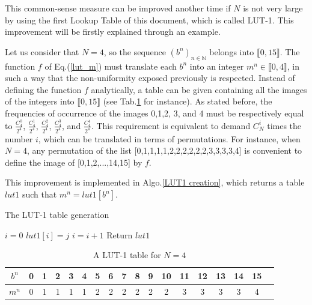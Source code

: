 This common-sense measure can be improved another time if $N$ is not very large by using the first Lookup 
Table of this document, which is called LUT-1.
This improvement will be firstly explained through an example.

Let us consider that $N=4$, so the sequence $(b^n)_{n \in \mathds{N}}$ belongs into $\llbracket 0, 15 \rrbracket$.
The function $f$ of Eq.(\ref{lut_m}) must translate each $b^n$ into an integer $m^n \in \llbracket 0,4 \rrbracket$, 
in such a way that the non-uniformity exposed previously is respected.
Instead of defining the function $f$ analytically, a table can be given containing all the images 
of the integers into $\llbracket 0, 15 \rrbracket$ (see Tab.\ref{LUT1 for example} for instance).
As stated before, the frequencies of occurrence of the images 0,1,2, 3, and 4 must be respectively equal 
to $\frac{C_4^0}{2^4}$, $\frac{C_4^1}{2^4}$, $\frac{C_4^2}{2^4}$, $\frac{C_4^3}{2^4}$, and $\frac{C_4^4}{2^4}$.
This requirement is equivalent to demand $C_N^i$ times the number $i$, which can be translated in terms of permutations.
For instance, when $N=4$, any permutation of the list [0,1,1,1,1,2,2,2,2,2,2,3,3,3,3,4] is convenient to 
define the image of [0,1,2,...,14,15] by $f$.

This improvement is implemented in Algo.\ref{LUT1 creation}, 
which returns a table $lut1$ such that $m^n=lut1[b^n]$.

\begin{algorithm}
\caption{The LUT-1 table generation}\label{LUT1 creation}
\begin{algorithmic}[1]
\STATE $i=0$
             \STATE $lut1[i]=j$
             \STATE $i = i + 1$
         \ENDWHILE
    \ENDFOR
\STATE Return $lut1$
\end{algorithmic}
\end{algorithm}

\begin{table} 
\renewcommand{\arraystretch}{1.3}
\caption{A LUT-1 table for $N=4$}
\label{LUT1 for example}
\centering
  \begin{tabular}{|c|c|c|c|c|c|c|c|c|c|c|c|c|c|c|c|c|c|}
    \hline
 $b^n$  & 0 & 1 & 2 & 3 & 4 & 5 & 6 & 7 &8 &9 &10 &11 &12 &13 &14 &15\\ \hline\hline
 $m^n$ & 0 & 1 & 1 & 1 & 1 & 2 & 2 & 2 & 2 & 2 & 2 & 3 & 3 &3 & 3 &4 \\ \hline

  \end{tabular}
\end{table}


